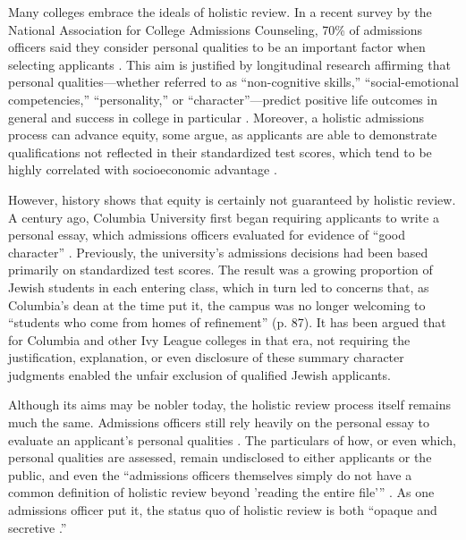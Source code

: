 \documentclass[11pt]{report}
\begin{document}
\begin{mainf}
Many colleges embrace the ideals of holistic review. In a recent survey by the National Association for College Admissions Counseling, 70\% of admissions officers said they consider personal qualities to be an important factor when selecting applicants \cite{national_research_council_assessing_2011}. This aim is justified by longitudinal research affirming that personal qualities—whether referred to as “non-cognitive skills,” “social-emotional competencies,” “personality,” or “character”—predict positive life outcomes in general and success in college in particular 
 \cite{moffitt_gradient_2011, almlund_personality_2011, robbins_psychosocial_2004, kyllonen_personality_2014}. Moreover, a holistic admissions process can advance equity, some argue, as applicants are able to demonstrate qualifications not reflected in their standardized test scores, which tend to be highly correlated with socioeconomic advantage \cite{coleman_understanding_2018}.

However, history shows that equity is certainly not guaranteed by holistic review. A century ago, Columbia University first began requiring applicants to write a personal essay, which admissions officers evaluated for evidence of “good character” 
 \cite{karabel_chosen_2005}. Previously, the university’s admissions decisions had been based primarily on standardized test scores. The result was a growing proportion of Jewish students in each entering class, which in turn led to concerns that, as Columbia’s dean at the time put it, the campus was no longer welcoming to “students who come from homes of refinement” (p. 87). It has been argued that for Columbia and other Ivy League colleges in that era, not requiring the justification, explanation, or even disclosure of these summary character judgments enabled the unfair exclusion of qualified Jewish applicants.
 

Although its aims may be nobler today, the holistic review process itself remains much the same. Admissions officers still rely heavily on the personal essay to evaluate an applicant’s personal qualities \cite{national_research_council_assessing_2011}. The particulars of how, or even which, personal qualities are assessed, remain undisclosed to either applicants or the public, and even the “admissions officers themselves simply do not have a common definition of holistic review beyond 'reading the entire file'” \cite{bastedo_what_2018}. As one admissions officer put it, the status quo of holistic review is both ``opaque and secretive \cite{starkman_confessions_2013}.''


\end{mainf}
\end{document}
